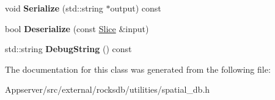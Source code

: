 \begin{DoxyCompactItemize}
\item 
void {\bfseries Serialize} (std\+::string $\ast$output) const\hypertarget{classrocksdb_1_1spatial_1_1FeatureSet_a1ecf6e07872b0b9b074ede1b6e7542f3}{}\label{classrocksdb_1_1spatial_1_1FeatureSet_a1ecf6e07872b0b9b074ede1b6e7542f3}

\item 
bool {\bfseries Deserialize} (const \hyperlink{classrocksdb_1_1Slice}{Slice} \&input)\hypertarget{classrocksdb_1_1spatial_1_1FeatureSet_a4b4e2a21b58261fbe09b2c5753463ad3}{}\label{classrocksdb_1_1spatial_1_1FeatureSet_a4b4e2a21b58261fbe09b2c5753463ad3}

\item 
std\+::string {\bfseries Debug\+String} () const\hypertarget{classrocksdb_1_1spatial_1_1FeatureSet_a08fd09258a3ec53d0c13f6c1c21b8aa9}{}\label{classrocksdb_1_1spatial_1_1FeatureSet_a08fd09258a3ec53d0c13f6c1c21b8aa9}

\end{DoxyCompactItemize}


The documentation for this class was generated from the following file\+:\begin{DoxyCompactItemize}
\item 
Appserver/src/external/rocksdb/utilities/spatial\+\_\+db.\+h\end{DoxyCompactItemize}
